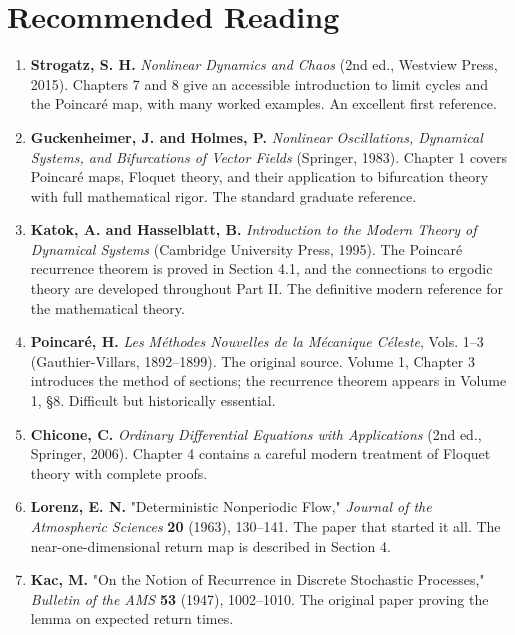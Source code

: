 \section*{Recommended Reading}

\begin{enumerate}[nosep]
  \item \textbf{Strogatz, S. H.} \textit{Nonlinear Dynamics and Chaos} (2nd ed., Westview Press, 2015). Chapters 7 and 8 give an accessible introduction to limit cycles and the Poincaré map, with many worked examples. An excellent first reference.

  \item \textbf{Guckenheimer, J. and Holmes, P.} \textit{Nonlinear Oscillations, Dynamical Systems, and Bifurcations of Vector Fields} (Springer, 1983). Chapter 1 covers Poincaré maps, Floquet theory, and their application to bifurcation theory with full mathematical rigor. The standard graduate reference.

  \item \textbf{Katok, A. and Hasselblatt, B.} \textit{Introduction to the Modern Theory of Dynamical Systems} (Cambridge University Press, 1995). The Poincaré recurrence theorem is proved in Section 4.1, and the connections to ergodic theory are developed throughout Part II. The definitive modern reference for the mathematical theory.

  \item \textbf{Poincaré, H.} \textit{Les Méthodes Nouvelles de la Mécanique Céleste}, Vols. 1--3 (Gauthier-Villars, 1892--1899). The original source. Volume 1, Chapter 3 introduces the method of sections; the recurrence theorem appears in Volume 1, §8. Difficult but historically essential.

  \item \textbf{Chicone, C.} \textit{Ordinary Differential Equations with Applications} (2nd ed., Springer, 2006). Chapter 4 contains a careful modern treatment of Floquet theory with complete proofs.

  \item \textbf{Lorenz, E. N.} "Deterministic Nonperiodic Flow," \textit{Journal of the Atmospheric Sciences} \textbf{20} (1963), 130--141. The paper that started it all. The near-one-dimensional return map is described in Section 4.

  \item \textbf{Kac, M.} "On the Notion of Recurrence in Discrete Stochastic Processes," \textit{Bulletin of the AMS} \textbf{53} (1947), 1002--1010. The original paper proving the lemma on expected return times.
\end{enumerate}
